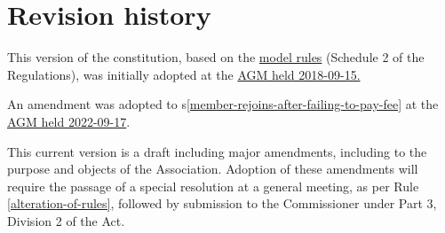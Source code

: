 \documentclass[../constitution.tex]{subfiles}
\begin{document}
\part*{Revision history}

This version of the constitution, based on the \href{https://www.commerce.wa.gov.au/consumer-protection/model-rules}{model rules} (Schedule 2 of the Regulations), was initially adopted at the \href{https://wiki.artifactory.org.au/en/minutes/AGM/2018-09-15}{AGM held 2018-09-15.}

An amendment was adopted to s\ref{member-rejoins-after-failing-to-pay-fee} at the \href{https://wiki.artifactory.org.au/en/minutes/AGM/2022-09-17}{AGM held 2022-09-17}.

This current version is a draft including major amendments, including to the purpose and objects of the Association. Adoption of these amendments will require the passage of a special resolution at a general meeting, as per Rule \ref{alteration-of-rules}, followed by submission to the Commissioner under Part 3, Division 2 of the Act.
\end{document}
